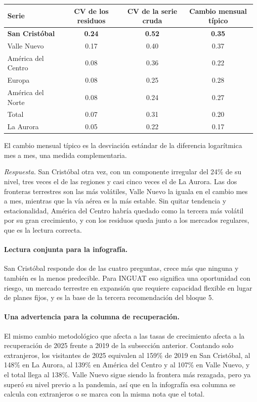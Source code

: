 \begin{center}
\begin{tabular}{@{}lccc@{}}
\toprule
Serie & CV de los residuos & CV de la serie cruda & Cambio mensual típico \\
\midrule
\textbf{San Cristóbal} & \textbf{0.24} & \textbf{0.52} & \textbf{0.35} \\
Valle Nuevo            & 0.17 & 0.40 & 0.37 \\
América del Centro     & 0.08 & 0.36 & 0.22 \\
Europa                 & 0.08 & 0.25 & 0.28 \\
América del Norte      & 0.08 & 0.24 & 0.27 \\
Total                  & 0.07 & 0.31 & 0.20 \\
La Aurora              & 0.05 & 0.22 & 0.17 \\
\bottomrule
\end{tabular}

{\footnotesize El cambio mensual típico es la desviación estándar de la diferencia logarítmica
mes a mes, una medida complementaria.}
\end{center}

\emph{Respuesta.} San Cristóbal otra vez, con un componente irregular del 24\% de su nivel, tres
veces el de las regiones y casi cinco veces el de La Aurora. Las dos fronteras terrestres son las
más volátiles, Valle Nuevo la iguala en el cambio mes a mes, mientras que la vía aérea es la más
estable. Sin quitar tendencia y estacionalidad, América del Centro habría quedado como la tercera
más volátil por su gran crecimiento, y con los residuos queda junto a los mercados regulares, que
es la lectura correcta.

\paragraph{Lectura conjunta para la infografía.} San Cristóbal responde dos de las cuatro
preguntas, crece más que ninguna y también es la menos predecible. Para INGUAT eso significa una
oportunidad con riesgo, un mercado terrestre en expansión que requiere capacidad flexible en
lugar de planes fijos, y es la base de la tercera recomendación del bloque 5.

\paragraph{Una advertencia para la columna de recuperación.} El mismo cambio metodológico que
afecta a las tasas de crecimiento afecta a la recuperación de 2025 frente a 2019 de la
subsección anterior. Contando solo extranjeros, los visitantes de 2025 equivalen al 159\% de
2019 en San Cristóbal, al 148\% en La Aurora, al 139\% en América del Centro y al 107\% en Valle
Nuevo, y el total llega al 138\%. Valle Nuevo sigue siendo la frontera más rezagada, pero ya
superó su nivel previo a la pandemia, así que en la infografía esa columna se calcula con
extranjeros o se marca con la misma nota que el total.
